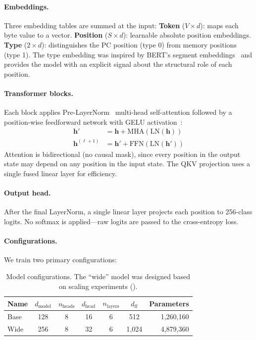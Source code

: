\documentclass[11pt,a4paper]{article}
\begin{document}
\paragraph{Embeddings.}
Three embedding tables are summed at the input:
\textbf{Token} ($V \times d$): maps each byte value to a vector.
\textbf{Position} ($S \times d$): learnable absolute position embeddings.
\textbf{Type} ($2 \times d$): distinguishes the PC position (type 0) from memory positions (type 1).
The type embedding was inspired by BERT's segment embeddings~\cite{devlin2019bert} and provides the model with an explicit signal about the structural role of each position.

\paragraph{Transformer blocks.}
Each block applies Pre-LayerNorm~\cite{xiong2020layer} multi-head self-attention followed by a position-wise feedforward network with GELU activation~\cite{hendrycks2016gelu}:
\begin{align}
  \mathbf{h}' &= \mathbf{h} + \mathrm{MHA}(\mathrm{LN}(\mathbf{h})) \\
  \mathbf{h}^{(\ell+1)} &= \mathbf{h}' + \mathrm{FFN}(\mathrm{LN}(\mathbf{h}'))
\end{align}
Attention is bidirectional (no causal mask), since every position in the output state may depend on any position in the input state.
The QKV projection uses a single fused linear layer for efficiency.

\paragraph{Output head.}
After the final LayerNorm, a single linear layer projects each position to 256-class logits.
No softmax is applied---raw logits are passed to the cross-entropy loss.

\paragraph{Configurations.}
We train two primary configurations:

\begin{table}[h]
\centering
\caption{Model configurations. The ``wide'' model was designed based on scaling experiments ().}
\label{tab:models}
\begin{tabular}{lcccccr}
\toprule
\textbf{Name} & $d_\text{model}$ & $n_\text{heads}$ & $d_\text{head}$ & $n_\text{layers}$ & $d_\text{ff}$ & \textbf{Parameters} \\
\midrule
Base & 128 & 8 & 16 & 6 & 512 & 1{,}260{,}160 \\
Wide & 256 & 8 & 32 & 6 & 1{,}024 & 4{,}879{,}360 \\
\bottomrule
\end{tabular}
\end{table}
\end{document}
